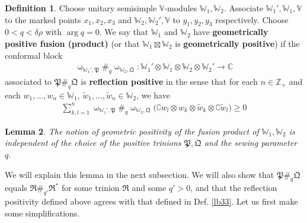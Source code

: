 \documentclass[11pt,b5paper,notitlepage]{article}
\theoremstyle{definition}
\newtheorem{df}{Definition}[section]
\theoremstyle{plain}
\newtheorem{lm}[df]{Lemma}
\newcommand{\fk}{\mathfrak}
\newcommand{\wtd}{\widetilde}
\newcommand{\Co}{\complement}
\newcommand{\Vbb}{\mathbb V}
\newcommand{\Wbb}{\mathbb W}
\newcommand{\Cbb}{\mathbb C}
\newcommand{\Zbb}{\mathbb Z}
\numberwithin{equation}{section}
\begin{document}
\begin{df}\label{lb39}
Choose unitary semisimple $\Vbb$-modules $\Wbb_1,\Wbb_2$. Associate $\Wbb_1',\Wbb_1,\Vbb$ to the marked points $x_1,x_2,x_3$ and $\Wbb_2,\Wbb_2',\Vbb$ to $y_1,y_2,y_3$ respectively. Choose $0<q<\delta\rho$ with $\arg q=0$. We say that $\Wbb_1$ and $\Wbb_2$ have \textbf{geometrically positive fusion (product)} (or that $\Wbb_1\boxtimes\Wbb_2$ is \textbf{geometrically positive}) if the conformal block
\begin{align*}
\upomega_{\Wbb_1',\fk P}\#_q\upomega_{\Wbb_2,\fk Q}:\Wbb_1'\otimes\Wbb_1\otimes\Wbb_2\otimes\Wbb_2'\rightarrow\Cbb
\end{align*}
associated to $\fk P\#_q\fk Q$ is \textbf{reflection positive} in the sense that for each $n\in\Zbb_+$ and each $w_1,\dots,w_n\in\Wbb_1$, $\wtd w_1,\dots,\wtd w_n\in\Wbb_2$, we have
\begin{align}
\sum_{k,l=1}^n\upomega_{\Wbb_1',\fk P}\#_q\upomega_{\Wbb_2,\fk Q}\big(\Co w_l\otimes  w_k\otimes  \wtd w_k \otimes \Co\wtd w_l\big)\geq0
\end{align}
\end{df}

\begin{lm}\label{lb40}
The notion of geometric positivity of the fusion product of $\Wbb_1,\Wbb_2$ is independent of the choice of the positive trinions $\fk P,\fk Q$ and the sewing parameter $q$.
\end{lm}

We will explain this lemma in the next subsection. We will also show that $\fk P\#_q\fk Q$ equals $\fk R\#_{q'}\fk R^*$ for some  trinion $\fk R$ and some $q'>0$, and that the reflection positivity defined above agrees with that defined in Def. \ref{lb33}. Let us first make some simplifications.
\end{document}

